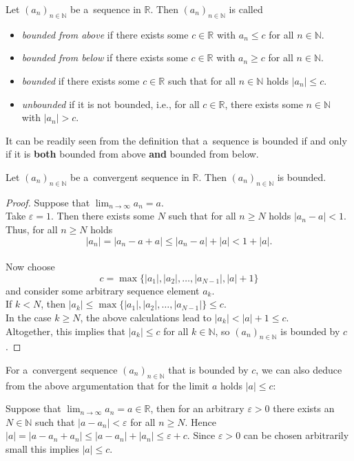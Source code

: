 
\begin{Definition}
  Let $(a_n)_{n\in\mathbb{N}}$ be a~sequence in $\mathbb{R}$. Then $(a_n)_{n\in\mathbb{N}}$ is called
\begin{itemize}
  \item \emph{bounded from above} if there exists some $c\in\mathbb{R}$ with $a_n \leq c$ for all $n\in\mathbb{N}$.
  \item \emph{bounded from below} if there exists some $c\in\mathbb{R}$ with $a_n \geq c$ for all $n\in\mathbb{N}$.
  \item \emph{bounded} if there exists some $c\in\mathbb{R}$ such that for all $n\in\mathbb{N}$ holds $|a_n|\leq c$.
  \item \emph{unbounded} if it is not bounded, i.e., for all $c\in\mathbb{R}$, there exists some $n\in\mathbb{N}$ with $|a_n|> c$.
\end{itemize}
\end{Definition}

\begin{Remark}{}
 It can be readily seen from the definition that a~sequence is bounded if and only if it is \textbf{both} bounded from above \textbf{and} bounded from below.
\end{Remark}

\begin{Theorem}
  Let $(a_n)_{n\in\mathbb{N}}$ be a~convergent sequence in $\mathbb{R}$. Then $(a_n)_{n\in\mathbb{N}}$ is bounded.
\end{Theorem}

\begin{proof}
Suppose that $\lim_{n\to\infty}a_n=a$.\\
Take $\varepsilon=1$. Then there exists some $N$ such that for all $n\geq N$ holds $|a_n-a|<1$.\\
Thus, for all $n\geq N$ holds
\[|a_n|=|a_n-a+a|\leq |a_n-a|+|a|<1+|a|.\]\\
Now choose
\[c=\max\{|a_1|,|a_2|,\ldots,|a_{N-1}|,|a|+1\}\]
and consider some arbitrary sequence element $a_k$.\\
If $k<N$, then $|a_k|\leq \max\{|a_1|,|a_2|,\ldots,|a_{N-1}|\}\leq c$.\\
In the case $k\geq N$, the above calculations lead to $|a_k|<|a|+1\leq c$.\\
Altogether, this implies that $|a_k|\leq c$ for all $k\in\mathbb{N}$, so $(a_n)_{n\in\mathbb{N}}$ is bounded by $c$.
\end{proof}

\begin{Remark}{}
  For a~convergent sequence $(a_n)_{n\in\mathbb{N}}$ that is bounded by $c$, we can also deduce from the above argumentation that for the limit $a$ holds $|a|\leq c$:

  Suppose that $\lim_{n\rightarrow\infty} a_n = a\in\mathbb{R}$, then for an arbitrary $\varepsilon>0$ there exists an $N\in\mathbb{N}$ such that
$|a-a_n|<\varepsilon$ for all $n\geq N$. Hence $|a|=|a-a_n+a_n|\leq|a-a_n|+|a_n|\leq \varepsilon + c$. Since $\varepsilon>0$ can be chosen arbitrarily small
this implies $|a|\leq c$.
\end{Remark}

